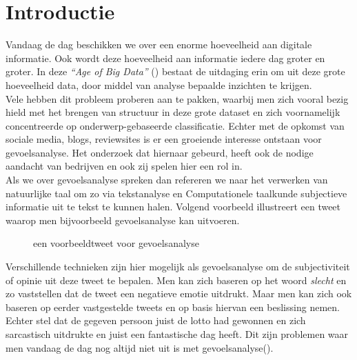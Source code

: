 \chapter{Introductie}\label{introductie}

Vandaag de dag beschikken we over een enorme hoeveelheid aan digitale informatie. Ook wordt deze hoeveelheid aan informatie iedere dag groter en groter. 
In deze \textit{``Age of Big Data''} (\cite{lohr2012age}) bestaat de uitdaging erin om uit deze grote hoeveelheid data, door middel van analyse bepaalde inzichten te krijgen.
\\
Vele hebben dit probleem proberen aan te pakken, waarbij men zich vooral bezig hield met het brengen van structuur in deze grote dataset en zich voornamelijk concentreerde op onderwerp-gebaseerde classificatie. Echter met de opkomst van sociale media, blogs, reviewsites is er een groeiende interesse ontstaan voor gevoelsanalyse. Het onderzoek dat hiernaar gebeurd, heeft ook de nodige aandacht van bedrijven en ook zij spelen hier een rol in.\\
Als we over gevoelsanalyse spreken dan refereren we naar het verwerken van natuurlijke taal  om zo via tekstanalyse en Computationele taalkunde subjectieve informatie uit te tekst te kunnen halen. Volgend voorbeeld illustreert een tweet waarop men bijvoorbeeld gevoelsanalyse kan uitvoeren.\\

\begin{figure}[h]%
    \centering
    \caption{een voorbeeldtweet voor gevoelsanalyse}%
\end{figure}
\newline

Verschillende technieken zijn hier mogelijk  als gevoelsanalyse om de subjectiviteit of opinie uit deze tweet te bepalen. Men kan zich baseren op het woord \textit{slecht} en zo vaststellen dat de tweet een negatieve emotie uitdrukt. Maar men kan zich ook baseren op eerder vastgestelde tweets en op basis hiervan een beslissing nemen. Echter stel dat de gegeven persoon juist de lotto had gewonnen en zich sarcastisch uitdrukte en juist een fantastische dag heeft. Dit zijn problemen waar men vandaag de dag nog altijd niet uit is met gevoelsanalyse(\cite{liebrecht2013perfect}).\\ 

